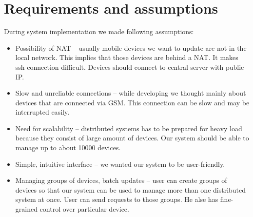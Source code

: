 \section{Requirements and assumptions}

During system implementation we made following assumptions:
\begin{itemize}
  \item Possibility of NAT -- usually mobile devices we want to update are not in the local network. This implies that those devices are behind a NAT. It makes ssh connection difficult. Devices should connect to central server with public IP.
  \item Slow and unreliable connections -- while developing we thought mainly about devices that are connected via GSM. This connection can be slow and may be interrupted easily.
  \item Need for scalability -- distributed systems has to be prepared for heavy load because they consist of large amount of devices. Our system should be able to manage up to about 10000 devices.
  \item Simple, intuitive interface -- we wanted our system to be user-friendly.
  \item Managing groups of devices, batch updates -- user can create groups of devices so that our system can be used to manage more than one distributed system at once. User can send requests to those groups. He alse has fine-grained control over particular device.
\end{itemize}
